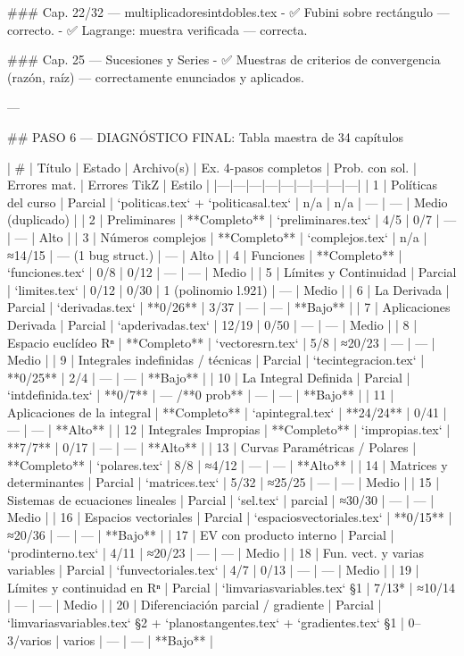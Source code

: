 \begin{myproof}
\begin{pasos}
\begin{example}
\begin{rem}
\begin{prob}
### Cap. 22/32 — multiplicadoresintdobles.tex
- ✅ Fubini sobre rectángulo — correcto.  
- ✅ Lagrange: muestra verificada — correcta.

### Cap. 25 — Sucesiones y Series
- ✅ Muestras de criterios de convergencia (razón, raíz) — correctamente enunciados y aplicados.

---

## PASO 6 — DIAGNÓSTICO FINAL: Tabla maestra de 34 capítulos

| # | Título | Estado | Archivo(s) | Ex. 4-pasos completos | Prob. con sol. | Errores mat. | Errores TikZ | Estilo |
|---|---|---|---|---|---|---|---|---|
| 1 | Políticas del curso | Parcial | `politicas.tex` + `politicasal.tex` | n/a | n/a | — | — | Medio (duplicado) |
| 2 | Preliminares | **Completo** | `preliminares.tex` | 4/5 | 0/7 | — | — | Alto |
| 3 | Números complejos | **Completo** | `complejos.tex` | n/a | ≈14/15 | — (1 bug struct.) | — | Alto |
| 4 | Funciones | **Completo** | `funciones.tex` | 0/8 | 0/12 | — | — | Medio |
| 5 | Límites y Continuidad | Parcial | `limites.tex` | 0/12 | 0/30 | 1 (polinomio l.921) | — | Medio |
| 6 | La Derivada | Parcial | `derivadas.tex` | **0/26** | 3/37 | — | — | **Bajo** |
| 7 | Aplicaciones Derivada | Parcial | `apderivadas.tex` | 12/19 | 0/50 | — | — | Medio |
| 8 | Espacio euclídeo Rⁿ | **Completo** | `vectoresrn.tex` | 5/8 | ≈20/23 | — | — | Medio |
| 9 | Integrales indefinidas / técnicas | Parcial | `tecintegracion.tex` | **0/25** | 2/4 | — | — | **Bajo** |
| 10 | La Integral Definida | Parcial | `intdefinida.tex` | **0/7** | — /**0 prob** | — | — | **Bajo** |
| 11 | Aplicaciones de la integral | **Completo** | `apintegral.tex` | **24/24** | 0/41 | — | — | **Alto** |
| 12 | Integrales Impropias | **Completo** | `impropias.tex` | **7/7** | 0/17 | — | — | **Alto** |
| 13 | Curvas Paramétricas / Polares | **Completo** | `polares.tex` | 8/8 | ≈4/12 | — | — | **Alto** |
| 14 | Matrices y determinantes | Parcial | `matrices.tex` | 5/32 | ≈25/25 | — | — | Medio |
| 15 | Sistemas de ecuaciones lineales | Parcial | `sel.tex` | parcial | ≈30/30 | — | — | Medio |
| 16 | Espacios vectoriales | Parcial | `espaciosvectoriales.tex` | **0/15** | ≈20/36 | — | — | **Bajo** |
| 17 | EV con producto interno | Parcial | `prodinterno.tex` | 4/11 | ≈20/23 | — | — | Medio |
| 18 | Fun. vect. y varias variables | Parcial | `funvectoriales.tex` | 4/7 | 0/13 | — | — | Medio |
| 19 | Límites y continuidad en Rⁿ | Parcial | `limvariasvariables.tex` §1 | 7/13* | ≈10/14 | — | — | Medio |
| 20 | Diferenciación parcial / gradiente | Parcial | `limvariasvariables.tex` §2 + `planostangentes.tex` + `gradientes.tex` §1 | 0–3/varios | varios | — | — | **Bajo** |

\end{prob}
\end{rem}
\end{example}
\end{pasos}
\end{myproof}
